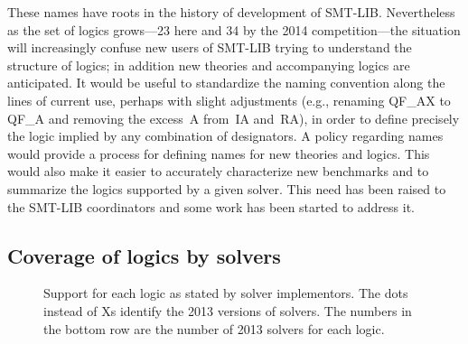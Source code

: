 \documentclass[smallcondensed]{svjour3}
\begin{document}
These names have roots in the history of development of SMT-LIB. Nevertheless as the set of logics grows---23 here and 34 by the 2014 competition---the situation will increasingly confuse new users of SMT-LIB trying to understand the structure of logics; in addition new theories and accompanying logics are anticipated.
It would be useful to standardize the naming convention along the lines of current use, perhaps with slight adjustments (e.g., renaming QF\_AX to QF\_A and removing the excess~A from~IA and~RA), in order to define precisely the logic implied by any combination of designators. A policy regarding names would provide a process for defining names for new theories and logics. This would
also make it easier to accurately characterize new benchmarks and to summarize the logics supported by a given solver. This need has been raised to the SMT-LIB coordinators and some work has been started to address it.


\subsection{Coverage of logics by solvers}
\label{Coverage}

\begin{figure}
\centering

\caption{Support for each logic as stated by solver implementors. The dots instead of Xs identify the 2013 versions of solvers. The numbers in the bottom row are the number of 2013 solvers for each logic.}
\label{Fig:solversupport}
\end{figure}
\end{document}
